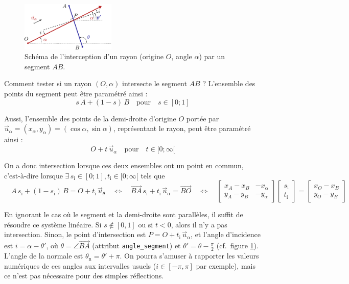 \documentclass{book}
\newcommand{\inline}[1]{\texttt{#1}}
\begin{document}
\begin{figure}[H]
  \centering
  \includegraphics[width=0.4\textwidth]{TD5/isect-seg-dd.pdf}
  \caption{Schéma de l'interception d'un rayon (origine $O$, angle $\alpha$) par un segment $AB$.}
  \label{fig:isect-seg-dd}
\end{figure}

Comment tester si un rayon $(O,\alpha)$ intersecte le segment $AB$ ? L'ensemble des points du segment peut être paramétré ainsi :
$$s\,A + (1-s)\,B \quad \text{pour} \quad s \in [0;1]$$

Aussi, l'ensemble des points de la demi-droite d'origine $O$ portée par $\vec{u}_{\alpha}=(x_\alpha,y_\alpha)=(\cos \alpha, \sin \alpha)$, représentant le rayon, peut être paramétré ainsi :
$$O + t\,\vec{u}_{\alpha} \quad \text{pour} \quad t \in [0; \infty [$$

On a donc intersection lorsque ces deux ensembles ont un point en commun, c'est-à-dire lorsque $\exists\,s_{\text{i}} \in [0; 1], t_{\text{i}} \in [0; \infty[$ tels que
\begin{equation*}
  \quad A\,s_{\text{i}} + (1-s_{\text{i}})\,B = O + t_{\text{i}}\,\vec{u}_{\theta}
  \quad \Leftrightarrow \quad
  \overrightarrow{BA}\,s_{\text{i}} + t_{\text{i}}\,\vec{u}_{\alpha} = \overrightarrow{BO}
  \quad \Leftrightarrow \quad
  \left[\begin{array}{cc}
     x_A - x_B & - x_{\alpha}\\
     y_A - y_B & - y_{\alpha}
   \end{array}\right]  \left[\begin{array}{c}
     s_{\text{i}}\\
     t_{\text{i}}
   \end{array}\right] = \left[\begin{array}{c}
     x_O - x_B\\
     y_O - y_B
   \end{array}\right]
\end{equation*}

En ignorant le cas où le segment et la demi-droite sont parallèles, il
suffit de résoudre ce système linéaire. Si $s \notin [0, 1]$ ou si $t < 0$,
alors il n'y a pas intersection. Sinon, le point d'intersection est $P = O + t_{\text{i}}\,\vec{u}_{\alpha}$, et l'angle d'incidence est $i = \alpha - \theta'$, où $\theta = \angle \overrightarrow{B A}$ (attribut \inline{angle_segment}) et $\theta' = \theta - \frac{\pi}{2}$ (cf.\ figure \ref{fig:isect-seg-dd}). L'angle de la normale est $\theta_{\text{n}} = \theta' + \pi$. On pourra s'amuser à rapporter les valeurs numériques de ces angles aux intervalles usuels ($i\in[-\pi,\pi]$ par exemple), mais ce n'est pas nécessaire pour des simples réflections.\\
\end{document}
